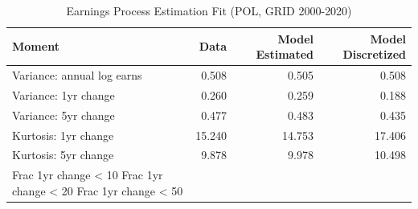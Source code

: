 \begin{table}
\caption{Earnings Process Estimation Fit (POL, GRID 2000-2020)}
\label{tab:earnings_fit_pol}
\begin{tabular}{lrrr}
\toprule
Moment & Data & Model Estimated & Model Discretized \\
\midrule
Variance: annual log earns & 0.508 & 0.505 & 0.508 \\
Variance: 1yr change & 0.260 & 0.259 & 0.188 \\
Variance: 5yr change & 0.477 & 0.483 & 0.435 \\
Kurtosis: 1yr change & 15.240 & 14.753 & 17.406 \\
Kurtosis: 5yr change & 9.878 & 9.978 & 10.498 \\
Frac 1yr change < 10%
Frac 1yr change < 20%
Frac 1yr change < 50%
\bottomrule
\end{tabular}
\end{table}
